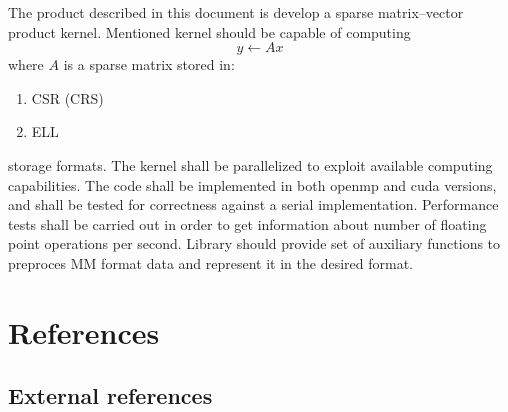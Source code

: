 	The product described in this document is develop a sparse matrix--vector product kernel. Mentioned kernel should be capable of computing
	\begin{equation}
	y \leftarrow Ax
	\end{equation}
	where $A$ is a sparse matrix stored in:
	\begin{enumerate}
		\item \gls{CSR} (\gls{CRS})
		\item \gls{ELL}
	\end{enumerate}
	storage formats. The kernel shall be parallelized to exploit available computing capabilities. The code shall be implemented in both \gls{openmp} and \gls{cuda} versions, and shall be tested for correctness against a serial implementation. Performance tests shall be carried out in order to get information about number of floating point operations per second. Library should provide set of auxiliary functions to preproces \gls{MM} format data and represent it in the desired format.
\section{References} \label{s:introduction:references}
	\begin{comment}
		$<$List all of the applicable reference documents. The references are separated into “external” references
		that are imposed external to the project and “internal” references that are imposed from within to the
		project. This may also be at the end of the document.$>$
	\end{comment}
	
\subsection*{External references} \label{s:introduction:external-references}
	\begin{comment}
		$<$List references to the relevant policies or laws that give rise to the need for this plan, e.g.		
		\begin{enumerate}
		\item Laws
		\item Government regulations
		\item Standards (e.g., governmental and/or consensus)
		\item IEEE Std. 829-2008 - IEEE Standard for Software and System Test Documentation.
		IEEE Computer Society, 2008.
		\item Policies
		\end{enumerate}
		The reference to this standard includes how and if it has been tailored for this project, an overview of
		the level(s) of documentation expected, and their contents (or a reference to an organizational standard
		or document that delineates the expected test documentation details).$>$
	\end{comment}

